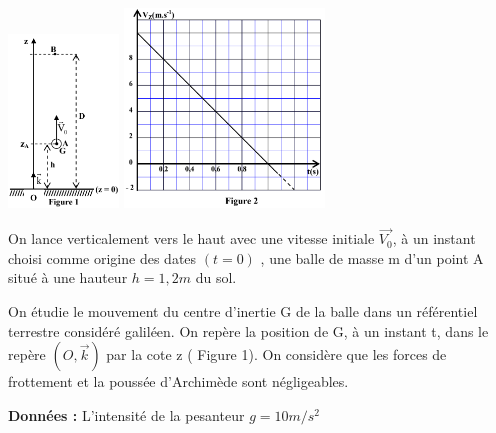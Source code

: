 \documentclass[12pt]{article}
\begin{document}
\begin{center}
  \includegraphics[width=0.22\textwidth]{./img/chute_verticale.png}
  \hspace{2cm}
  \includegraphics[width=0.4\textwidth]{./img/chute_ve_courbe.png}
\end{center}



On lance verticalement vers le haut avec une vitesse initiale
$\vec{V_0}$, à un instant choisi comme origine des dates $(t=0)$ , une balle de masse m d’un
point A situé à une hauteur $h = 1,2 m$ du sol.

On étudie le mouvement du centre d’inertie G de la balle dans un
référentiel terrestre considéré galiléen. On repère la position de G,
à un instant t, dans le repère $(O, \vec{k})$ par la cote z ( Figure 1).
On considère que les forces de frottement et la poussée d’Archimède sont
négligeables.

\textbf{Données : }L’intensité de la pesanteur $g = 10 m/s^2$
\end{document}
